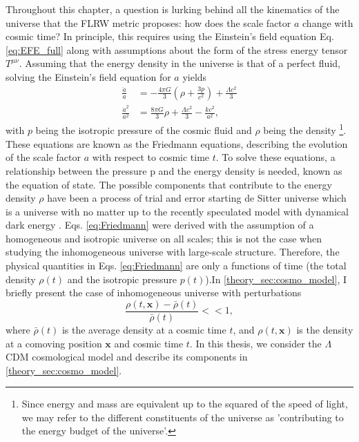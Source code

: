 Throughout this chapter, a question is lurking behind all the kinematics of the universe that the FLRW metric proposes: how does the scale factor $a$ change with cosmic time? In principle, this requires using the Einstein's field equation Eq. \ref{eq:EFE_full} along with assumptions about the form of the stress energy tensor $T^{\mu \nu}$. Assuming that the energy density in the universe is that of a perfect fluid, solving the Einstein's field equation for $a$ yields 
\begin{subequations}
\label{eq:Friedmann}
\begin{align} 
    \frac{\ddot{a}}{a} &= -\frac{4\pi G}{3} \left( \rho + \frac{3p}{c^2} \right) + \frac{\Lambda c^2}{3} \label{eq:Friedmann1} \\
    \frac{\dot{a}^2}{a^2} &= \frac{8\pi G}{3} \rho + \frac{\Lambda c^2}{3} - \frac{kc^2}{a^2}, \label{eq:Friedmann2}
\end{align}
\end{subequations}
with $p$ being the isotropic pressure of the cosmic fluid and $\rho$ being the density \footnote{Since energy and mass are equivalent up to the squared of the speed of light, we may refer to the different constituents of the universe as 'contributing to the energy budget of the universe'.}. These equations are known as the Friedmann equations, describing the evolution of the scale factor $a$ with respect to cosmic time $t$. To solve these equations, a relationship between the pressure p and the energy density is needed, known as the equation of state. The possible components that contribute to the energy density $\rho$ have been a process of trial and error starting de Sitter universe \citep{deSitter_1917} which is a universe with no matter up to the recently speculated model with dynamical dark energy \citep{adame2025desi}. Eqs. \ref{eq:Friedmann} were derived with the assumption of a homogeneous and isotropic universe on all scales; this is not the case when studying the inhomogeneous universe with large-scale structure. Therefore, the physical quantities in Eqs. \ref{eq:Friedmann} are only a functions of time (the total density $\rho(t)$ and the isotropic pressure $p(t)$).In \ref{theory_sec:cosmo_model}, I briefly present the case of inhomogeneous universe with perturbations 
\begin{equation}
    \frac{\rho(t, \mathbf{x}) - \bar{\rho}(t)}{\bar{\rho}(t)} << 1,
\end{equation}
where $\bar{\rho}(t)$ is the average density at a cosmic time $t$, and $\rho(t, \mathbf{x})$ is the density at a comoving position $\mathbf{x}$ and cosmic time $t$. In this thesis, we consider the $\Lambda$CDM cosmological model and describe its components in \ref{theory_sec:cosmo_model}.


